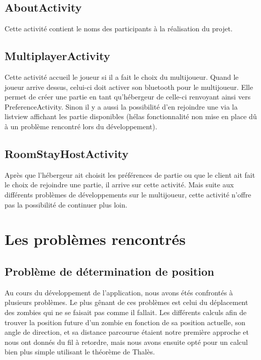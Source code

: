 \documentclass{article}
\begin{document}
\subsection{AboutActivity}

Cette activité contient le noms des participants à la réalisation du projet.

\subsection{MultiplayerActivity}

Cette activité accueil le joueur si il a fait le choix du multijoueur. Quand le joueur arrive dessus, celui-ci doit activer son bluetooth pour le multijoueur. Elle permet de créer une partie en tant qu'hébergeur de celle-ci renvoyant ainsi vers PreferenceActivity. Sinon il y a aussi la possibilité d'en rejoindre une via la listview affichant les partie disponibles (hélas fonctionnalité non mise en place dû à un problème rencontré lors du développement).  

\subsection{RoomStayHostActivity}

Après que l'hébergeur ait choisit les préférences de partie ou que le client ait fait le choix de rejoindre une partie, il arrive sur cette activité. Mais suite aux différents problèmes de développements sur le multijoueur, cette activité n'offre pas la possibilité de continuer plus loin. 

\section{Les problèmes rencontrés}

\subsection{Problème de détermination de position}

Au cours du développement de l'application, nous avons étés confrontés à plusieurs problèmes. Le plus gênant de ces problèmes est celui du déplacement des zombies qui ne se faisait pas comme il fallait.
Les différents calculs afin de trouver la position future d'un zombie en fonction de sa position actuelle, son angle de direction, et sa distance parcourue étaient notre première approche et nous ont donnés du fil à retordre, mais nous avons ensuite opté pour un calcul bien plus simple utilisant le théorème de Thalès.
\end{document}
